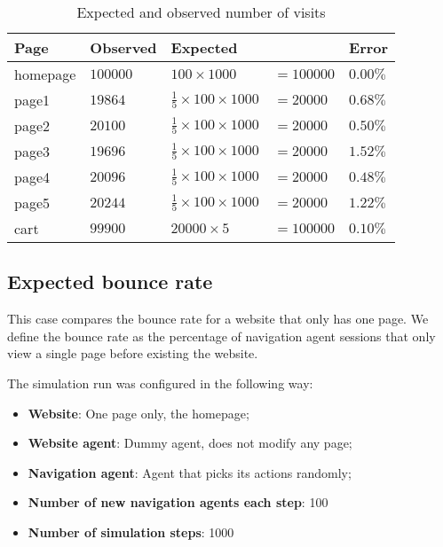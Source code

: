 \begin{table}[]
    \centering
    \caption{Expected and observed number of visits}
    \label{tab:test2results}
    \begin{tabular}{@{}lllll@{}}
        \toprule
        Page     & Observed   & \multicolumn{2}{l}{Expected} & Error  \\ 
        \midrule
        homepage & $100000$   & $100 \times 1000$ & $ = 100000$      & $0.00\%$ 
        \\
        page1    & $19864$    & $\frac{1}{5} \times 100 \times 1000$ & $ = 
        20000$ &         $0.68\%$ \\
        page2    & $20100$    & $\frac{1}{5} \times 100 \times 1000$ & $ = 
        20000$ &         $0.50\%$ \\
        page3    & $19696$    & $\frac{1}{5} \times 100 \times 1000$ & $ = 
        20000$ &         $1.52\%$ \\
        page4    & $20096$    & $\frac{1}{5} \times 100 \times 1000$ & $ = 
        20000$ &         $0.48\%$ \\
        page5    & $20244$    & $\frac{1}{5} \times 100 \times 1000$ & $ = 
        20000$ &         $1.22\%$ \\
        cart     & $99900$    & $20000 \times 5$ & $ = 100000$       & $0.10\%$ 
        \\ 
        \bottomrule
    \end{tabular}
\end{table}

\subsection{Expected bounce rate}

This case compares the bounce rate for a website that only has one page. We 
define the bounce rate as the percentage of navigation agent sessions that only 
view a single page before existing the website.

The simulation run was configured in the following way:

\begin{itemize}
    \item \textbf{Website}: One page only, the homepage;
    \item \textbf{Website agent}: Dummy agent, does not modify any page;
    \item \textbf{Navigation agent}: Agent that picks its actions randomly;
    \item \textbf{Number of new navigation agents each step}: 100
    \item \textbf{Number of simulation steps}: 1000
\end{itemize}

